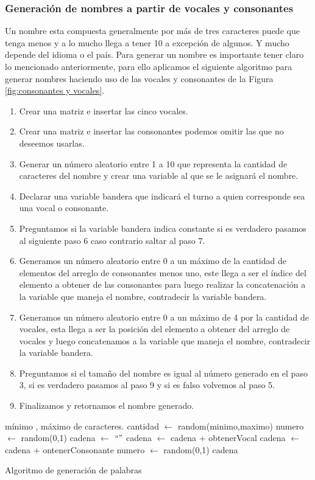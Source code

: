 \subsubsection{Generaci\'on de nombres a partir de vocales y consonantes}
Un nombre esta compuesta generalmente por m\'as de tres caracteres puede que tenga menos y a lo mucho llega a tener 10 a excepci\'on de algunos. Y mucho depende del idioma o el pa\'is.
Para generar un nombre es importante tener claro lo mencionado anteriormente, para ello aplicamos el siguiente algoritmo para generar nombres haciendo uso de las vocales y consonantes de la Figura \ref{fig:consonantes y vocales}.
\begin{enumerate}
\item Crear una matriz e insertar las cinco vocales.
\item Crear una matriz e insertar las consonantes podemos omitir las que no deseemos usarlas.
\item Generar un n\'umero aleatorio entre 1 a 10 que representa la cantidad de caracteres del nombre y crear una variable al que se le asignar\'a el nombre.
\item Declarar una variable bandera que indicar\'a el turno a quien corresponde sea una vocal o consonante.
\item Preguntamos si la variable bandera indica constante si es verdadero pasamos al siguiente paso 6 caso contrario saltar al paso 7.
\item Generamos un n\'umero aleatorio entre 0 a un m\'aximo de la cantidad de elementos del arreglo de consonantes menos uno, este llega a ser el \'indice del elemento a obtener de las consonantes para luego realizar la concatenaci\'on a la variable que maneja el nombre, contradecir la variable bandera.
\item Generamos un n\'umero aleatorio entre 0 a un m\'aximo de 4 por la cantidad de vocales, esta llega a ser la posici\'on del elemento a obtener del arreglo de vocales y luego concatenamos a la variable que maneja el nombre, contradecir la variable bandera.
\item Preguntamos si el tama\~no del nombre es igual al n\'umero generado en el paso 3, si es verdadero pasamos al paso 9 y si es falso volvemos al paso 5.
\item Finalizamos y retornamos el nombre generado. 
\end{enumerate}
\begin{algorithm}[H]
\begin{algorithmic}[1]
\REQUIRE m\'inimo , m\'aximo de caracteres.
\STATE cantidad $\leftarrow$ random(minimo,maximo)
\STATE numero $\leftarrow$ random(0,1)
\STATE cadena $\leftarrow$ $`` "$
\STATE cadena $\leftarrow$ cadena + obtenerVocal
\ELSE
\STATE cadena $\leftarrow$ cadena + ontenerConsonante
\ENDIF
\STATE numero $\leftarrow$ random(0,1)
\ENDWHILE
\RETURN cadena
\end{algorithmic}
\caption{Algoritmo de generaci\'on de palabras}\label{alg:algoritmoGeneracionPalabras}
\end{algorithm}

